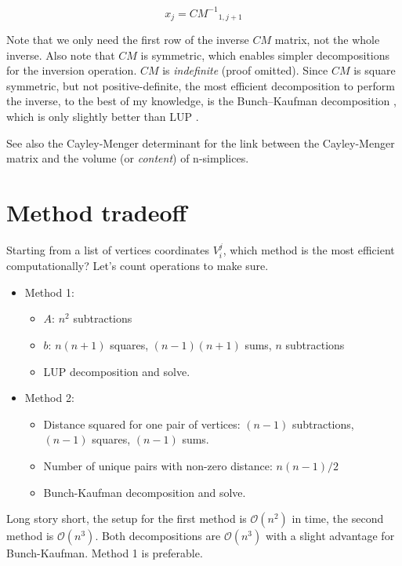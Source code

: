 \begin{equation} \label{eq:cm-coords}
x_j = {CM^{-1}}_{1,j+1}
\end{equation}

Note that we only need the first row of the inverse $CM$ matrix, not the whole
inverse. Also note that $CM$ is symmetric, which enables simpler decompositions
for the inversion operation. $CM$ is \emph{indefinite} (proof omitted).
Since $CM$ is square symmetric, but not positive-definite, the most efficient
decomposition to perform the inverse, to the best of my knowledge, is the
Bunch–Kaufman decomposition \cite{Bunch:1976}, which is only slightly better
than LUP \cite{wiki:lu-decomposition}.

See also the Cayley-Menger determinant \cite{wiki:cayley-menger-determinant}
for the link between the Cayley-Menger matrix and the volume (or
\emph{content}) of n-simplices.

\section{Method tradeoff}
Starting from a list of vertices coordinates $V_i^j$, which method is the most
efficient computationally? Let's count operations to make sure.

\begin{minipage}{\textwidth} \begin{itemize}
\item Method 1: \begin{itemize}
\item $A$: $n^2$ subtractions
\item $b$: $n(n+1)$ squares, $(n-1)(n+1)$ sums, $n$ subtractions
\item LUP decomposition \cite{wiki:lu-decomposition} and solve.
\end{itemize}
\item Method 2: \begin{itemize}
\item Distance squared for one pair of vertices: $(n-1)$ subtractions, $(n-1)$
      squares, $(n-1)$ sums.
\item Number of unique pairs with non-zero distance: $n(n-1)/2$
\item Bunch-Kaufman decomposition \cite{Bunch:1976} and solve.
\end{itemize} \end{itemize} \end{minipage}

Long story short, the setup for the first method is $\mathcal{O}(n^2)$ in time,
the second method is $\mathcal{O}(n^3)$. Both decompositions are
$\mathcal{O}(n^3)$ with a slight advantage for Bunch-Kaufman. Method 1 is
preferable.
